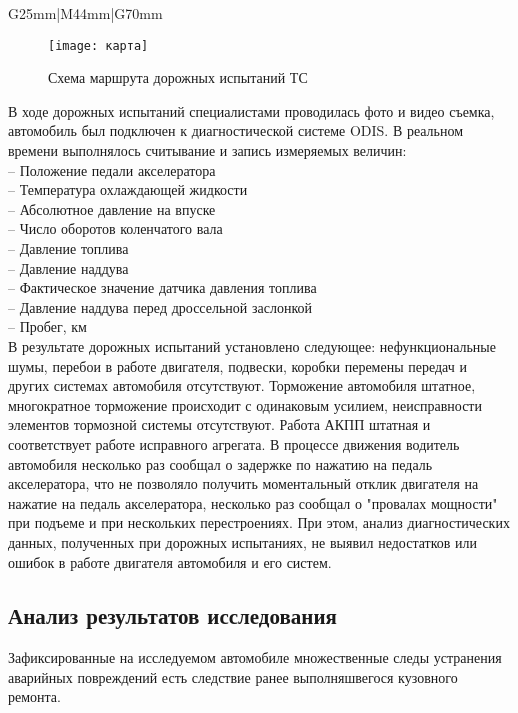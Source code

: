 \begin{longtable}{G{25mm}|M{44mm}|G{70mm}}
 \begin{figure}[H]
 	\centering
 	\texttt{[image: карта]}
 	\caption{Схема маршрута дорожных испытаний ТС  }
 	\label{shemam}
 \end{figure}
 В ходе дорожных испытаний специалистами  проводилась фото и видео съемка,  автомобиль был подключен к диагностической системе ODIS. В реальном времени выполнялось считывание и запись измеряемых величин:\\
 -- Положение педали акселератора\\
 -- Температура охлаждающей жидкости\\
 -- Абсолютное давление на впуске\\
 -- Число оборотов коленчатого вала\\
 -- Давление топлива\\
 -- Давление наддува\\
 -- Фактическое значение датчика давления топлива\\
 -- Давление наддува перед дроссельной заслонкой\\
 -- Пробег, км\\
  
 В результате дорожных испытаний установлено следующее: нефункциональные шумы, перебои в работе двигателя, подвески, коробки перемены передач и других системах автомобиля отсутствуют.   Торможение автомобиля штатное, многократное торможение происходит с одинаковым усилием, неисправности элементов тормозной системы отсутствуют. Работа АКПП штатная и соответствует работе исправного агрегата. В процессе движения водитель автомобиля несколько раз сообщал о задержке  по нажатию на педаль акселератора, что  не  позволяло получить моментальный отклик двигателя на нажатие на педаль акселератора, несколько раз сообщал о "провалах  мощности" при подъеме и при нескольких перестроениях. При этом, анализ диагностических данных, полученных при дорожных испытаниях, не выявил недостатков или ошибок в работе двигателя автомобиля и его систем.  \\
 

\subsection{Анализ результатов исследования}

   Зафиксированные на исследуемом автомобиле  множественные следы устранения аварийных повреждений есть следствие ранее выполняшвегося кузовного ремонта.\\  



\end{longtable}
